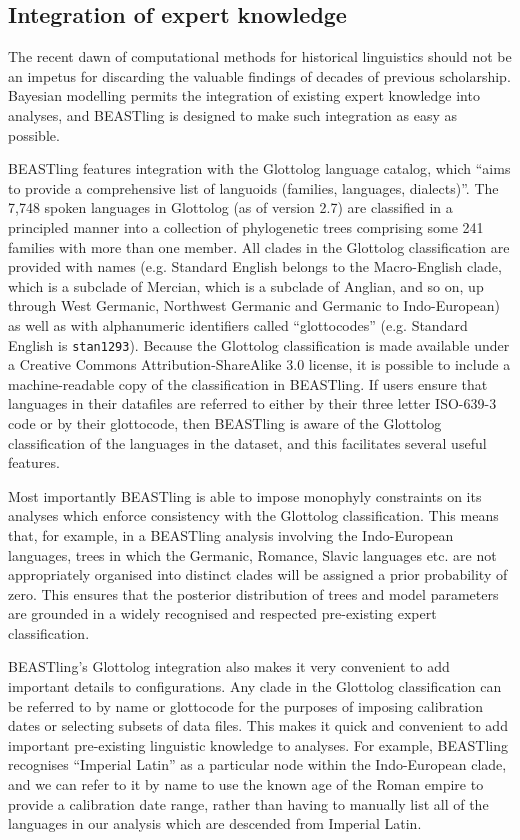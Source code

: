 \documentclass[twocolumn,10pt]{scrartcl}
\begin{document}
\subsection{Integration of expert knowledge}

The recent dawn of computational methods for historical linguistics should not be an impetus for discarding the valuable findings of decades of previous scholarship.  Bayesian modelling permits the integration of existing expert knowledge into analyses, and BEASTling is designed to make such integration as easy as possible.

BEASTling features integration with the Glottolog language catalog\cite{Hammarstroem2016}, which ``aims to provide a comprehensive list of languoids (families, languages, dialects)''.  The  7,748 spoken languages in Glottolog (as of version 2.7) are classified in a principled manner into a collection of phylogenetic trees comprising some 241 families with more than one member.  All clades in the Glottolog classification are provided with names (e.g. Standard English belongs to the Macro-English clade, which is a subclade of Mercian, which is a subclade of Anglian, and so on, up through West Germanic, Northwest Germanic and Germanic to Indo-European) as well as with alphanumeric identifiers called ``glottocodes'' (e.g. Standard English is \texttt{stan1293}).  Because the Glottolog classification is made available under a Creative Commons Attribution-ShareAlike 3.0 license, it is possible to include a machine-readable copy of the classification in BEASTling.  If users ensure that languages in their datafiles are referred to either by their three letter ISO-639-3 code or by their glottocode, then BEASTling is aware of the Glottolog classification of the languages in the dataset, and this facilitates several useful features.

Most importantly BEASTling is able to impose monophyly constraints on its analyses which enforce consistency with the Glottolog classification.  This means that, for example, in a BEASTling analysis involving the Indo-European languages, trees in which the Germanic, Romance, Slavic languages etc. are not appropriately organised into distinct clades will be assigned a prior probability of zero.  This ensures that the posterior distribution of trees and model parameters are grounded in a widely recognised and respected pre-existing expert classification.

BEASTling's Glottolog integration also makes it very convenient to add important details to configurations.  Any clade in the Glottolog classification can be referred to by name or glottocode for the purposes of imposing calibration dates or selecting subsets of data files.  This makes it quick and convenient to add important pre-existing linguistic knowledge to analyses.  For example, BEASTling recognises ``Imperial Latin'' as a particular node within the Indo-European clade, and we can refer to it by name to use the known age of the Roman empire to provide a calibration date range, rather than having to manually list all of the languages in our analysis which are descended from Imperial Latin.
\end{document}

